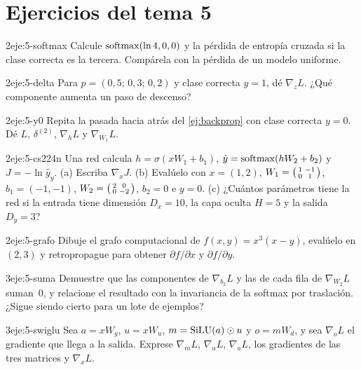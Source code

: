 \section*{Ejercicios del tema 5}

\begin{ejercicio}{2}{eje:5-softmax}
Calcule $\operatorname{softmax}(\ln 4,0,0)$ y la pérdida de entropía cruzada si la clase correcta es la tercera. Compárela con la pérdida de un modelo uniforme.
\end{ejercicio}

\begin{ejercicio}{2}{eje:5-delta}
Para $p=(0{,}5;\,0{,}3;\,0{,}2)$ y clase correcta $y=1$, dé $\nabla_{\!z}L$. ¿Qué componente aumenta un paso de descenso?
\end{ejercicio}

\begin{ejercicio}{2}{eje:5-y0}
Repita la pasada hacia atrás del \cref{ej:backprop} con clase correcta $y=0$. Dé $L$, $\delta^{(2)}$, $\nabla_{\!h}L$ y $\nabla_{\!W_1}L$.
\end{ejercicio}

\begin{ejercicio}{2}{eje:5-cs224n}
Una red calcula $h=\sigma(xW_1+b_1)$, $\hat y=\operatorname{softmax}(hW_2+b_2)$ y $J=-\ln\hat y_y$. (a) Escriba $\nabla_{\!x}J$. (b) Evalúelo con $x=(1,2)$, $W_1=\begin{psmallmatrix}1&-1\\0&1\end{psmallmatrix}$, $b_1=(-1,-1)$, $W_2=\begin{psmallmatrix}2&0\\0&-2\end{psmallmatrix}$, $b_2=0$ e $y=0$. (c) ¿Cuántos parámetros tiene la red si la entrada tiene dimensión $D_x=10$, la capa oculta $H=5$ y la salida $D_y=3$?
\end{ejercicio}

\begin{ejercicio}{2}{eje:5-grafo}
Dibuje el grafo computacional de $f(x,y)=x^{3}(x-y)$, evalúelo en $(2,3)$ y retropropague para obtener $\partial f/\partial x$ y $\partial f/\partial y$.
\end{ejercicio}

\begin{ejercicio}{3}{eje:5-suma}
Demuestre que las componentes de $\nabla_{\!b_2}L$ y las de cada fila de $\nabla_{\!W_2}L$ suman~0, y relacione el resultado con la invariancia de la softmax por traslación. ¿Sigue siendo cierto para un lote de ejemplos?
\end{ejercicio}

\begin{ejercicio}{3}{eje:5-swiglu}
Sea $a=xW_g$, $u=xW_u$, $m=\operatorname{SiLU}(a)\odot u$ y $o=mW_d$, y sea $\nabla_{\!o}L$ el gradiente que llega a la salida. Exprese $\nabla_{\!m}L$, $\nabla_{\!u}L$, $\nabla_{\!a}L$, los gradientes de las tres matrices y $\nabla_{\!x}L$.
\end{ejercicio}
